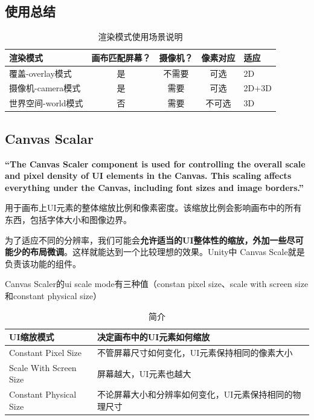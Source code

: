 \documentclass[UTF8,a4paper,12pt]{ctexbook}
\begin{document}
		\subsection{使用总结}
			\begin{table}[H]
				\centering
				\caption{渲染模式使用场景说明}
				\begin{tabular}{p{5cm}<{\centering}|c|c|c|p{4cm}<{\centering}}
					\toprule
						渲染模式 & 画布匹配屏幕？& 摄像机？ & 像素对应 & 适应\\
					\midrule
						覆盖-overlay模式 & 是	& 不需要	& 可选 & 2D \\
						摄像机-camera模式 & 是	& 需要	 & 可选 & 2D+3D\\
						世界空间-world模式 & 否	& 需要	 & 不可选 & 3D\\
					\bottomrule
				\end{tabular}
			\end{table}
		
		\subsection{Canvas Scalar}
			\textbf{“The Canvas Scaler component is used for controlling the overall scale and pixel density of UI elements in the Canvas. This scaling affects everything under the Canvas, including font sizes and image borders.”}

			用于画布上UI元素的整体缩放比例和像素密度。该缩放比例会影响画布中的所有东西，包括字体大小和图像边界。
			
			为了适应不同的分辨率，我们可能会\textbf{允许适当的UI整体性的缩放，外加一些尽可能少的布局微调}。这样就能达到一个比较理想的效果。Unity中 Canvas Scale就是负责该功能的组件。
			 
			Canvas Scaler的ui scale mode有三种值（constan pixel size、scale with screen size和constant physical size）
			
			\begin{table}[H]
				\centering
				\caption{简介}
				\begin{tabular}{p{4.5cm}<{\centering}|p{11.5cm}<{\centering}}
					\hline
						UI缩放模式 &  决定画布中的UI元素如何缩放\\
					\hline
						Constant Pixel Size & 不管屏幕尺寸如何变化，UI元素保持相同的像素大小\\
						Scale With Screen Size & 屏幕越大，UI元素也越大\\
						Constant Physical Size & 不论屏幕大小和分辨率如何变化，UI元素保持相同的物理尺寸\\
					\hline
				\end{tabular}
			\end{table}
			
\end{document}
